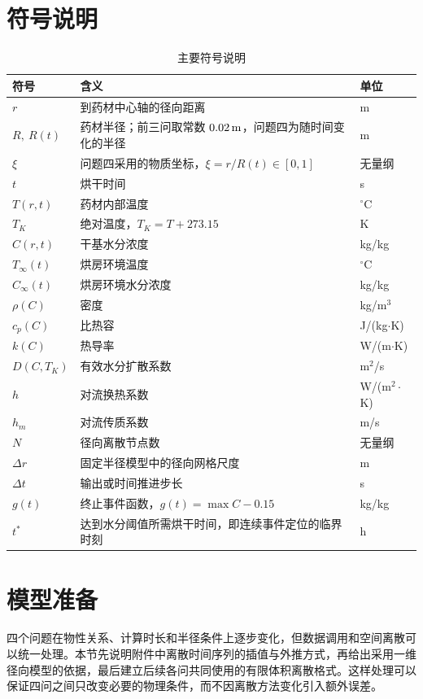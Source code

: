 \documentclass[UTF8,a4paper,12pt]{ctexart}
\begin{document}
\section{符号说明}
\begin{table}[H]
  \centering
  \caption{主要符号说明}
  \label{tab:symbols}
  \begin{tabular}{>{\centering\arraybackslash}p{}p{}>{\centering\arraybackslash}p{}}
    \toprule
    符号 & 含义 & 单位\\ \midrule
    $r$ & 到药材中心轴的径向距离 & m\\
    $R,\ R(t)$ & 药材半径；前三问取常数 $0.02\rm\,m$，问题四为随时间变化的半径 & m\\
    $\xi$ & 问题四采用的物质坐标，$\xi=r/R(t)\in[0,1]$ & 无量纲\\
    $t$ & 烘干时间 & s\\
    $T(r,t)$ & 药材内部温度 & $^\circ\mathrm C$\\
    $T_K$ & 绝对温度，$T_K=T+273.15$ & K\\
    $C(r,t)$ & 干基水分浓度 & kg/kg\\
    $T_\infty(t)$ & 烘房环境温度 & $^\circ\mathrm C$\\
    $C_\infty(t)$ & 烘房环境水分浓度 & kg/kg\\
    $\rho(C)$ & 密度 & kg/m$^3$\\
    $c_p(C)$ & 比热容 & J/(kg$\cdot$K)\\
    $k(C)$ & 热导率 & W/(m$\cdot$K)\\
    $D(C,T_K)$ & 有效水分扩散系数 & m$^2$/s\\
    $h$ & 对流换热系数 & W/(m$^2\cdot$K)\\
    $h_m$ & 对流传质系数 & m/s\\
    $N$ & 径向离散节点数 & 无量纲\\
    $\Delta r$ & 固定半径模型中的径向网格尺度 & m\\
    $\Delta t$ & 输出或时间推进步长 & s\\
    $g(t)$ & 终止事件函数，$g(t)=\max C-0.15$ & kg/kg\\
    $t^*$ & 达到水分阈值所需烘干时间，即连续事件定位的临界时刻 & h\\
    \bottomrule
  \end{tabular}
\end{table}

\section{模型准备}
四个问题在物性关系、计算时长和半径条件上逐步变化，但数据调用和空间离散可以统一处理。本节先说明附件中离散时间序列的插值与外推方式，再给出采用一维径向模型的依据，最后建立后续各问共同使用的有限体积离散格式。这样处理可以保证四问之间只改变必要的物理条件，而不因离散方法变化引入额外误差。
\end{document}
